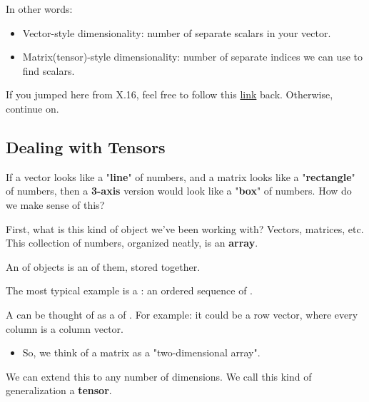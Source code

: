         In other words:

        \begin{itemize}
            \item Vector-style dimensionality: number of separate scalars in your vector.
            \item Matrix(tensor)-style dimensionality: number of separate indices we can use to find scalars.
        \end{itemize}
        
        If you jumped here from X.16, feel free to follow this \hyperref[X.16]{link} back. Otherwise, continue on.
    
    \secdiv
    
    \subsection{Dealing with Tensors}
    
        If a vector looks like a "\textbf{line}" of numbers, and a matrix looks like a "\textbf{rectangle}" of numbers, then a \textbf{3-axis} version would look like a "\textbf{box}" of numbers. How do we make sense of this?
        
        First, what is this kind of object we've been working with? Vectors, matrices, etc. This collection of numbers, organized neatly, is an \textbf{array}.\\
        
        \begin{definition}
            An  of objects is an  of them, stored together. 
            
            The most typical example is a : an ordered sequence of .
            
            A  can be thought of as a  of . For example: it could be a row vector, where every column is a column vector. 

            \begin{itemize}
                \item So, we think of a matrix as a "two-dimensional array". 
            \end{itemize}
            
            
        \end{definition}
        
        We can extend this to any number of dimensions. We call this kind of generalization a \textbf{tensor}.\\
        
